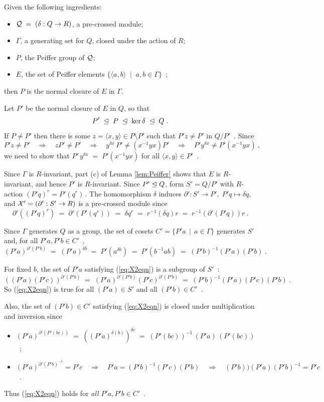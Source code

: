\begin{prop}
Given the following ingredients:
\begin{itemize}
\item
$\mathcal{Q} \;=\; (\delta : Q \to R)$, a pre-crossed module;
\item
$\Gamma$, a generating set for $Q$, closed under the action of $R$;
\item
$P$, the Peiffer group of $\mathcal{Q}$;
\item
$E$, the set of Peiffer elements  
$\{\langle a,b \rangle \;\mid\; a,b \in \Gamma\}$~;
\end{itemize}
then  $P$  is the normal closure of $E$ in $\Gamma$.
\end{prop}
\begin{pf}
Let  $P'$  be the normal closure of  $E$  in  $Q$,  so that
$$
P' \;\trianglelefteq\; P \;\trianglelefteq\; \ker\delta \;\trianglelefteq\; Q~.
$$
If  $P \neq P'$  then there is some
$z = \langle x,y \rangle \in P \setminus P'$
such that
$P'z \neq P'$  in  $Q/P'$~.
Since
$$
P'z \neq P' \quad\Rightarrow\quad
zP' \neq P' \quad\Rightarrow\quad
y^{\delta x}\,P' \neq (x^{-1}yx)P' \quad\Rightarrow\quad
P'y^{\delta x} \neq P'(x^{-1}yx)~,
$$
we need to show that
$P'\,y^{\delta x} \;=\; P'(x^{-1}yx)$  
for all $\langle x,y \rangle \in P'$~.

Since  $\Gamma$  is  $R$-invariant,
part (c) of Lemma \ref{lem:Peiffer} shows that  $E$  is  $R$-invariant,
and hence  $P'$  is  $R$-invariant.
Since  $P' \trianglelefteq Q$,
form  $S' = Q/P'$  with $R$-action  $(P'q)^r = P'(q^r)\,$.
The homomorphism  $\delta$  induces
$\partial' : S' \to P',\; P'q \mapsto \delta q$,  and
$\mathcal{X}' = (\partial' : S' \to R)$  is a pre-crossed module since
$$
\partial'((P'q)^r) \;=\;
\partial'(P'(q^r)) \;=\;
\delta q^r \;=\;
r^{-1}(\delta q)r \;=\;
r^{-1}(\partial'(P'q))r~.
$$

Since  $\Gamma$  generates  $Q$  as a group,  the set of cosets
$C' = \{P'a \,\mid\, a \in \Gamma\}$
generates  $S'$ and, for all  $P'a,P'b \in C'$~,
\begin{equation}\label{eq:X2eqn}
(P'a)^{\partial'(P'b)} \;=\;
(P'a)^{\delta b} \;=\;
P'(a^{\delta b}) \;=\;
P'(b^{-1}ab) \;=\;
(P'b)^{-1}(P'a)(P'b)~.
\end{equation}

For fixed  $b$,  the set of  $P'a$  satisfying (\ref{eq:X2eqn})
is a subgroup of  $S'$~:
$$
((P'a)(P'c))^{\partial'(P'b)} \;=\;
(P'a)^{\partial'(P'b)}(P'c)^{\partial'(P'b)} \;=\;
(P'b)^{-1}(P'a)(P'c)(P'b)~.
$$
So (\ref{eq:X2eqn}) is true for all  $(P'a) \in S'$  and all  $(P'b) \in C'$~.

Also, the set of  $(P'b) \in C'$  satisfying  (\ref{eq:X2eqn})
is closed under multiplication and inversion since
\begin{itemize}
\item
$(P'a)^{\partial'(P'(bc))} \;=\;
((P'a)^{\delta(b)})^{\delta c} \;=\;
(P'(bc))^{-1}\,(P'a)\,(P'(bc))$~;
\item
$(P'a)^{\partial'(P'b)^{-1}} = P'c \quad\Rightarrow\quad
P'a=(P'b)^{-1}(P'c)(P'b) \quad\Rightarrow\quad
(P'b))(P'a)(P'b)^{-1} = P'c$~.
\end{itemize}
Thus (\ref{eq:X2eqn}) holds for \emph{all}  $P'a, P'b \in C'$~.
\end{pf}



